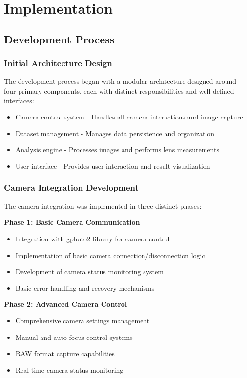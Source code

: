 \chapter{Implementation}
\section{Development Process}


 
 \subsection{Initial Architecture Design}
The development process began with a modular architecture designed around four primary components, each with distinct responsibilities and well-defined interfaces:

\begin{itemize}
    \item Camera control system - Handles all camera interactions and image capture
    \item Dataset management - Manages data persistence and organization
    \item Analysis engine - Processes images and performs lens measurements
    \item User interface - Provides user interaction and result visualization
\end{itemize}

\subsection{Camera Integration Development}
The camera integration was implemented in three distinct phases:

\textbf{Phase 1: Basic Camera Communication}
\begin{itemize}
    \item Integration with gphoto2 library for camera control
    \item Implementation of basic camera connection/disconnection logic
    \item Development of camera status monitoring system
    \item Basic error handling and recovery mechanisms
\end{itemize}

\textbf{Phase 2: Advanced Camera Control}
\begin{itemize}
    \item Comprehensive camera settings management
    \item Manual and auto-focus control systems
    \item RAW format capture capabilities
    \item Real-time camera status monitoring
\end{itemize}

